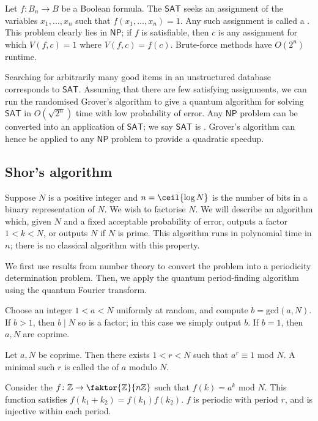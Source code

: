 Let $f \colon B_n \to B$ be a Boolean formula.
The  $\mathsf{SAT}$ seeks an assignment of the variables $x_1, \dots, x_n$ such that $f(x_1, \dots, x_n) = 1$.
Any such assignment is called a .
This problem clearly lies in $\mathsf{NP}$; if $f$ is satisfiable, then $c$ is any assignment for which $V(f,c) = 1$ where $V(f,c) = f(c)$.
Brute-force methods have $O(2^n)$ runtime.

Searching for arbitrarily many good items in an unstructured database corresponds to $\mathsf{SAT}$.
Assuming that there are few satisfying assignments, we can run the randomised Grover's algorithm to give a quantum algorithm for solving $\mathsf{SAT}$ in $O(\sqrt{2^n})$ time with low probability of error.
Any $\mathsf{NP}$ problem can be converted into an application of $\mathsf{SAT}$; we say $\mathsf{SAT}$ is .
Grover's algorithm can hence be applied to any $\mathsf{NP}$ problem to provide a quadratic speedup.

\subsection{Shor's algorithm}
Suppose $N$ is a positive integer and $n = \ceil{\log N}$ is the number of bits in a binary representation of $N$.
We wish to factorise $N$.
We will describe an algorithm which, given $N$ and a fixed acceptable probability of error, outputs a factor $1 < k < N$, or outputs $N$ if $N$ is prime.
This algorithm runs in polynomial time in $n$; there is no classical algorithm with this property.

We first use results from number theory to convert the problem into a periodicity determination problem.
Then, we apply the quantum period-finding algorithm using the quantum Fourier transform.

Choose an integer $1 < a < N$ uniformly at random, and compute $b = \mathrm{gcd}(a,N)$.
If $b > 1$, then $b \mid N$ so is a factor; in this case we simply output $b$.
If $b = 1$, then $a, N$ are coprime.
\begin{theorem}
    Let $a, N$ be coprime.
    Then there exists $1 < r < N$ such that $a^r \equiv 1$ mod $N$.
    A minimal such $r$ is called the  of $a$ modulo $N$.
\end{theorem}
Consider the  $f \colon \mathbb Z \to \faktor{\mathbb Z}{n\mathbb Z}$ such that $f(k) = a^k$ mod $N$.
This function satisfies $f(k_1 + k_2) = f(k_1)f(k_2)$.
$f$ is periodic with period $r$, and is injective within each period.

